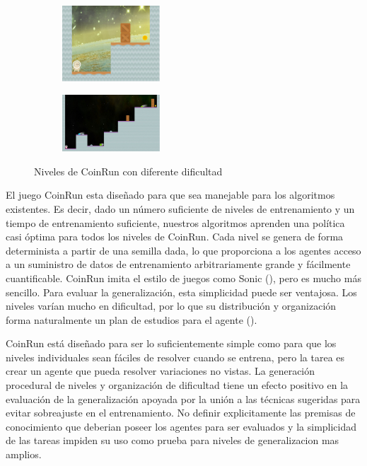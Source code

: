 \begin{figure}[ht!]
    \begin{subfigure}
      \centering
      \includegraphics[width=0.4\textwidth]{Graphics/coinrun_1.jpeg}
      \label{fig:coinrun1}
    \end{subfigure}%
    \begin{subfigure}
      \centering
      \includegraphics[width=0.4\textwidth]{Graphics/coinrun_2.jpeg}
      \label{fig:coinrun2}
    \end{subfigure}%
    \caption{Niveles de CoinRun con diferente dificultad}
    \label{fig:coinrun}
\end{figure}

El juego CoinRun esta diseñado para que sea manejable para los algoritmos existentes. Es decir, dado un número suficiente de niveles de entrenamiento y un tiempo de entrenamiento suficiente, nuestros algoritmos aprenden una política casi óptima para todos los niveles de CoinRun. Cada nivel se genera de forma determinista a partir de una semilla dada, lo que proporciona a los agentes acceso a un suministro de datos de entrenamiento arbitrariamente grande y fácilmente cuantificable. CoinRun imita el estilo de juegos como Sonic (\cite{nichol2018gotta}), pero es mucho más sencillo. Para evaluar la generalización, esta simplicidad puede ser ventajosa. Los niveles varían mucho en dificultad, por lo que su distribución y organización forma naturalmente un plan de estudios para el agente (\cite{cobbe2019quantifying}).

CoinRun está diseñado para ser lo suficientemente simple como para que los niveles individuales sean fáciles de resolver cuando se entrena, pero la tarea es crear un agente que pueda resolver variaciones no vistas. La generación procedural de niveles y organización de dificultad tiene un efecto positivo en la evaluación de la generalización apoyada por la unión a las técnicas sugeridas para evitar sobreajuste en el entrenamiento. No definir explicitamente las premisas de conocimiento que deberian poseer los agentes para ser evaluados y la simplicidad de las tareas impiden su uso como prueba para niveles de generalizacion mas amplios.

